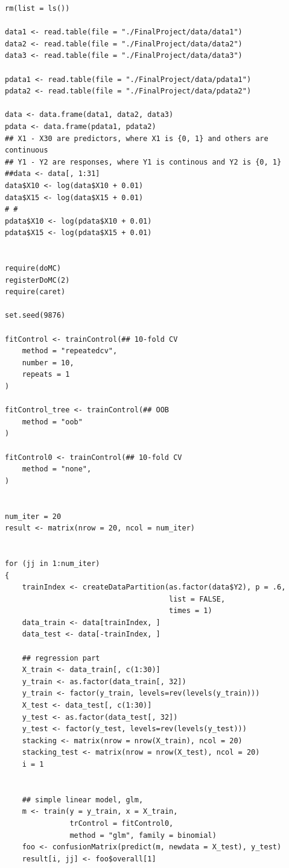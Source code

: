 \documentclass[11pt,oneside,a4paper]{article}
\begin{document}
\clearpage
\begin{verbatim}
rm(list = ls())

data1 <- read.table(file = "./FinalProject/data/data1")
data2 <- read.table(file = "./FinalProject/data/data2")
data3 <- read.table(file = "./FinalProject/data/data3")

pdata1 <- read.table(file = "./FinalProject/data/pdata1")
pdata2 <- read.table(file = "./FinalProject/data/pdata2")

data <- data.frame(data1, data2, data3)
pdata <- data.frame(pdata1, pdata2)
## X1 - X30 are predictors, where X1 is {0, 1} and others are continuous
## Y1 - Y2 are responses, where Y1 is continous and Y2 is {0, 1}
##data <- data[, 1:31]
data$X10 <- log(data$X10 + 0.01)
data$X15 <- log(data$X15 + 0.01)
# # 
pdata$X10 <- log(pdata$X10 + 0.01)
pdata$X15 <- log(pdata$X15 + 0.01)


require(doMC)
registerDoMC(2)
require(caret)

set.seed(9876)

fitControl <- trainControl(## 10-fold CV
    method = "repeatedcv",
    number = 10, 
    repeats = 1
)

fitControl_tree <- trainControl(## OOB
    method = "oob"
)

fitControl0 <- trainControl(## 10-fold CV
    method = "none",
)


num_iter = 20
result <- matrix(nrow = 20, ncol = num_iter)


for (jj in 1:num_iter)
{
    trainIndex <- createDataPartition(as.factor(data$Y2), p = .6,
                                      list = FALSE,
                                      times = 1)
    data_train <- data[trainIndex, ]
    data_test <- data[-trainIndex, ]
    
    ## regression part
    X_train <- data_train[, c(1:30)]
    y_train <- as.factor(data_train[, 32])
    y_train <- factor(y_train, levels=rev(levels(y_train)))
    X_test <- data_test[, c(1:30)]
    y_test <- as.factor(data_test[, 32])
    y_test <- factor(y_test, levels=rev(levels(y_test)))
    stacking <- matrix(nrow = nrow(X_train), ncol = 20)
    stacking_test <- matrix(nrow = nrow(X_test), ncol = 20)
    i = 1
    
    
    ## simple linear model, glm,
    m <- train(y = y_train, x = X_train,
               trControl = fitControl0,
               method = "glm", family = binomial)
    foo <- confusionMatrix(predict(m, newdata = X_test), y_test)
    result[i, jj] <- foo$overall[1]
    

\end{verbatim}
\end{document}
